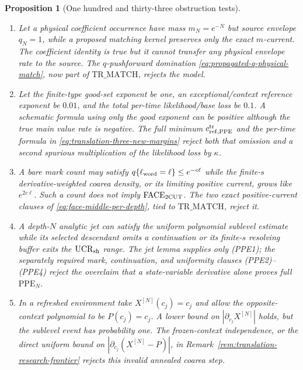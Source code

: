 \documentclass[11pt]{article}
\newtheorem{proposition}[theorem]{Proposition}
\begin{document}
\begin{proposition}[One hundred and thirty-three obstruction tests]
\begin{enumerate}[label=\textup{(T\arabic*)}]
      \eqref{eq:normalized-shallow-recovery}, explicitly retained in
      $\mathrm{TR\_FACE\_REC}$, rejects this false implication.
\item Let a physical coefficient occurrence have mass $m_N=e^{-N}$ but
      source envelope $q_N=1$, while a proposed matching kernel preserves
      only the exact $m$-current.  The coefficient identity is true but it
      cannot transfer any physical envelope rate to the source.  The
      $q$-pushforward domination \eqref{eq:propagated-q-physical-match},
      now part of $\mathrm{TR\_MATCH}$, rejects the model.
\item Let the finite-type good-set exponent be one, an exceptional/context
      reference exponent be $0.01$, and the total per-time likelihood/base
      loss be $0.1$.  A schematic formula using only the good exponent can
      be positive although the true main value rate is negative.  The full
      minimum $c_{{\rm ref},{\rm PPE}}^{\rm tr}$ and the per-time formula in
      \eqref{eq:translation-three-new-margins} reject both that omission and
      a second spurious multiplication of the likelihood loss by $\kappa$.
\item A bare mark count may satisfy
      $q\{\ell_{\rm word}=\ell\}\le e^{-c\ell}$ while the finite-$s$
      derivative-weighted coarea density, or its limiting positive current,
      grows like $e^{2c\ell}$.  Such a count does not imply
      $\mathrm{FACE}_{\rm 2CUT}$.  The two exact positive-current clauses of
      \eqref{eq:face-middle-per-depth}, tied to $\mathrm{TR\_MATCH}$, reject
      it.
\item A depth-$N$ analytic jet can satisfy the uniform polynomial sublevel
      estimate while its selected descendant omits a continuation or its
      finite-$s$ resolving buffer exits the $\mathrm{UCR}_{\rm sh}$ range.
      The jet lemma supplies only \textup{(PPE1)}; the separately required
      mark, continuation, and uniformity clauses \textup{(PPE2)--(PPE4)}
      reject the overclaim that a
      state-variable derivative alone proves full $\mathrm{PPE}_N$.
\item In a refreshed environment take $X^{[N]}(c_j)=c_j$ and allow the
      opposite-context polynomial to be $P(c_j)=c_j$.  A lower bound on
      $|\partial_{c_j}X^{[N]}|$ holds, but the sublevel event has probability
      one.  The frozen-context independence, or the direct uniform bound on
      $|\partial_{c_j}(X^{[N]}-P)|$, in
      Remark~\ref{rem:translation-research-frontier} rejects this invalid
      annealed coarea step.

\end{enumerate}
\end{proposition}
\end{document}
